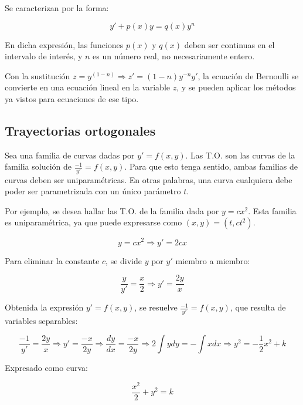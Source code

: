 \documentclass{article}
\begin{document}
Se caracterizan por la forma:

\begin{equation}
y' + p(x) y = q(x) y^n
\end{equation}

En dicha expresión, las funciones $p(x)$ y $q(x)$ deben ser continuas en el intervalo de interés, y $n$ es un número real, no necesariamente entero.

Con la sustitución $z = y^(1-n) \Rightarrow z' = (1-n) y^{-n} y'$, la ecuación de Bernoulli se convierte en una ecuación lineal en la variable $z$, y se pueden aplicar los métodos ya vistos para ecuaciones de ese tipo.

\subsection{Trayectorias ortogonales}

Sea una familia de curvas dadas por $y' = f(x,y)$. Las T.O. son las curvas de la familia solución de $\frac{-1}{y'} = f(x,y)$. Para que esto tenga sentido, ambas familias de curvas deben ser uniparamétricas. En otras palabras, una curva cualquiera debe poder ser parametrizada con un único parámetro $t$.

Por ejemplo, se desea hallar las T.O. de la familia dada por $y = c x^2$. Esta familia es uniparamétrica, ya que puede expresarse como $(x, y) = (t, c t^2)$.

\begin{equation}
y = c x^2 \Rightarrow y' = 2 c x
\end{equation}

Para eliminar la constante $c$, se divide $y$ por $y'$ miembro a miembro:

\begin{equation}
\frac{y}{y'} = \frac{x}{2} \Rightarrow y' = \frac{2y}{x}
\end{equation}

Obtenida la expresión $y' = f(x,y)$, se resuelve $\frac{-1}{y'} = f(x,y)$, que resulta de variables separables:

\begin{equation}
\frac{-1}{y'} = \frac{2y}{x} \Rightarrow y' = \frac{-x}{2y} \Rightarrow \frac{dy}{dx} = \frac{-x}{2y} \Rightarrow 2 \int y dy = -\int x dx \Rightarrow y^2 = -\frac{1}{2} x^2 + k
\end{equation}

Expresado como curva:

\begin{equation}
\frac{x^2}{2} + y^2 = k
\end{equation}
\end{document}
